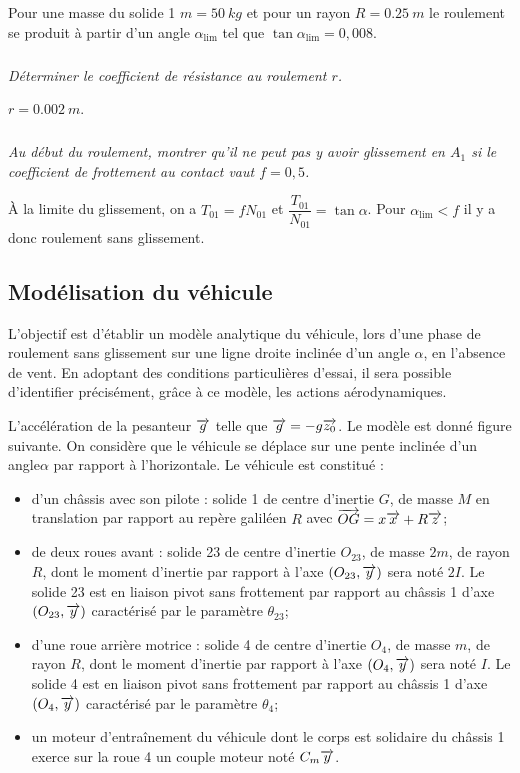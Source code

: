 \documentclass[10pt,fleqn]{article} %
\begin{document}
\begin{multicols}{2}
Pour une masse du solide 1 $m = \SI{50}{kg}$ et pour un rayon $R = \SI{0,25}{m}$ le roulement se produit à partir d’un angle  $\alpha_{\text{lim}}$ tel que $\tan \alpha_{\text{lim}} = 0,008$. 

\subparagraph{}
\textit{Déterminer le coefficient de résistance au roulement $r$.}
\ifprof
\begin{corrige}
$r=\SI{0,002}{m}$.
\end{corrige}
\else
\fi


\subparagraph{}
\textit{Au début du roulement, montrer qu’il ne peut pas y avoir glissement en $A_1$ si le coefficient de frottement au contact vaut $f = 0,5$. }
\ifprof
\begin{corrige}
À la limite du glissement, on a $T_{01}=fN_{01}$ et $\dfrac{T_{01}}{N_{01}}=\tan\alpha$. Pour $\alpha_{\text{lim}}<f$ il y a donc roulement sans glissement. 
\end{corrige}
\else
\fi
\subsection*{Modélisation du véhicule}

\ifprof
\else

L’objectif est d’établir un modèle analytique du véhicule, lors d’une phase de roulement sans glissement sur une ligne droite inclinée d’un angle $\alpha$, en l’absence de vent. En adoptant des conditions particulières d’essai, il sera possible d’identifier précisément, grâce à ce modèle, les actions aérodynamiques. 

L’accélération de la pesanteur $\overrightarrow{g}$ telle que $\overrightarrow{g}=-g\overrightarrow{z_0}$. Le modèle est donné figure suivante. On considère que le véhicule se déplace sur une pente inclinée d’un angle$\alpha$ par rapport à l’horizontale. Le véhicule est constitué :
\begin{itemize}
\item d’un châssis avec son pilote : solide 1 de centre d’inertie $G$, de masse $M$ en translation par rapport au repère galiléen $R$ avec $\overrightarrow{OG}=x\overrightarrow{x}+R\overrightarrow{z}$;
\item de deux roues avant : solide 23 de centre d’inertie $O_{23}$, de masse $2 m$, de rayon $R$, dont le moment d’inertie par rapport à l’axe $\left(O_{23},\overrightarrow{{y}}\right)$ sera noté $2I$. Le solide 23 est en liaison pivot sans frottement par rapport au châssis 1 d’axe $\left(O_{23},\overrightarrow{{y}}\right)$ caractérisé par le paramètre $\theta_{23}$;
\item d’une roue arrière motrice : solide 4 de centre d’inertie $O_4$, de masse $m$, de rayon $R$, dont le moment d’inertie par rapport à l’axe $\left(O_{4},\overrightarrow{{y}}\right)$ sera noté $I$. Le solide 4 est en liaison pivot sans frottement par rapport au châssis 1 d’axe $\left(O_{4},\overrightarrow{{y}}\right)$ caractérisé par le paramètre $\theta_4$; 
\item un moteur d’entraînement du véhicule dont le corps est solidaire du châssis 1 exerce sur la roue 4 un couple moteur noté $C_m \overrightarrow{y}$. 
\end{itemize}


\end{multicols}
\end{document}
